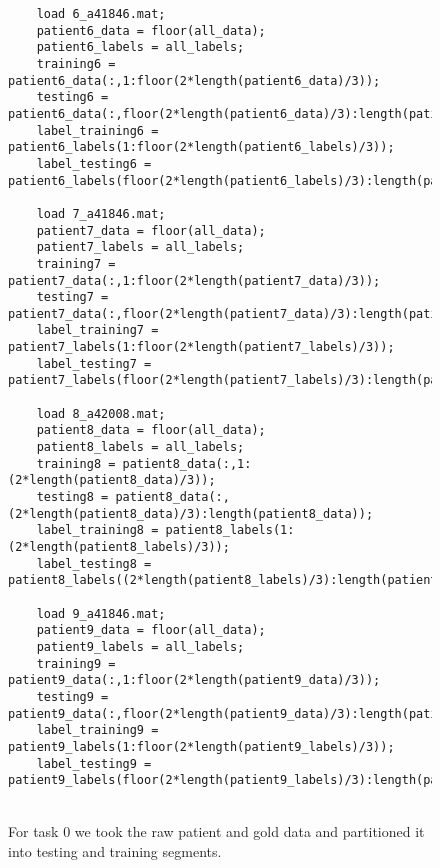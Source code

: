 \documentclass{article}
\begin{document}
\begin{figure}[H]
\begin{lstlisting}
    load 6_a41846.mat;
    patient6_data = floor(all_data);
    patient6_labels = all_labels;
    training6 = patient6_data(:,1:floor(2*length(patient6_data)/3));
    testing6 = patient6_data(:,floor(2*length(patient6_data)/3):length(patient6_data));
    label_training6 = patient6_labels(1:floor(2*length(patient6_labels)/3));
    label_testing6 = patient6_labels(floor(2*length(patient6_labels)/3):length(patient6_labels));

    load 7_a41846.mat;
    patient7_data = floor(all_data);
    patient7_labels = all_labels;
    training7 = patient7_data(:,1:floor(2*length(patient7_data)/3));
    testing7 = patient7_data(:,floor(2*length(patient7_data)/3):length(patient7_data));
    label_training7 = patient7_labels(1:floor(2*length(patient7_labels)/3));
    label_testing7 = patient7_labels(floor(2*length(patient7_labels)/3):length(patient7_labels));

    load 8_a42008.mat;
    patient8_data = floor(all_data);
    patient8_labels = all_labels;
    training8 = patient8_data(:,1:(2*length(patient8_data)/3));
    testing8 = patient8_data(:,(2*length(patient8_data)/3):length(patient8_data));
    label_training8 = patient8_labels(1:(2*length(patient8_labels)/3));
    label_testing8 = patient8_labels((2*length(patient8_labels)/3):length(patient8_labels));

    load 9_a41846.mat;
    patient9_data = floor(all_data);
    patient9_labels = all_labels;
    training9 = patient9_data(:,1:floor(2*length(patient9_data)/3));
    testing9 = patient9_data(:,floor(2*length(patient9_data)/3):length(patient9_data));
    label_training9 = patient9_labels(1:floor(2*length(patient9_labels)/3));
    label_testing9 = patient9_labels(floor(2*length(patient9_labels)/3):length(patient9_labels));
\end{lstlisting}
\\ For task 0 we took the raw patient and gold data and partitioned it into testing and training segments.

\end{figure}
\end{document}
